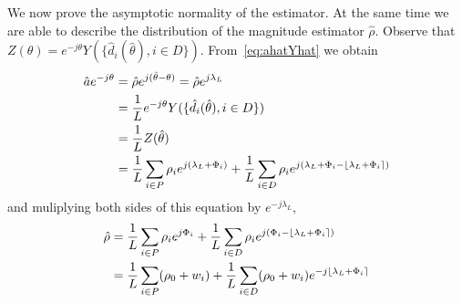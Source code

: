 \documentclass[a4paper,10pt]{article}
\begin{document}
We now prove the asymptotic normality of the estimator.  At the same time we are able to describe the distribution of the magnitude estimator $\hat{\rho}$.  Observe that $Z(\theta) = e^{-j\theta}Y(\{\hat{d}_i(\hat{\theta}), i \in D\})$.  From~\eqref{eq:ahatYhat} we obtain
\begin{align*}\label{eq:hata}
\hat{a} e^{-j\theta} &= \hat{\rho} e^{j(\hat{\theta} - \theta)} = \hat{\rho} e^{j\lambda_L} \\
&= \frac{1}{L} e^{-j\theta} Y(\{\hat{d}_i(\hat{\theta}), i \in D\}) \\
&= \frac{1}{L}  Z(\hat{\theta}) \\
&= \frac{1}{L} \sum_{i \in P} \rho_i e^{j(\lambda_L + \Phi_i)} + \frac{1}{L}  \sum_{i \in D}  \rho_i e^{j( \lambda_L + \Phi_i - {\left\lfloor \lambda_L + \Phi_i \right\rceil})}
\end{align*}
and muliplying both sides of this equation by $e^{-j\lambda_L}$,
\begin{align*}\label{eq:hatrhoworking}
\hat{\rho} &=  \frac{1}{L} \sum_{i \in P} \rho_i e^{j\Phi_i} + \frac{1}{L}  \sum_{i \in D}  \rho_i e^{j(\Phi_i - {\left\lfloor \lambda_L + \Phi_i \right\rceil})} \\
 &=  \frac{1}{L} \sum_{i \in P} (\rho_0 + w_i) + \frac{1}{L}  \sum_{i \in D}  (\rho_0 + w_i)e^{-j{\left\lfloor \lambda_L + \Phi_i \right\rceil}} 
\end{align*}


\end{document}

